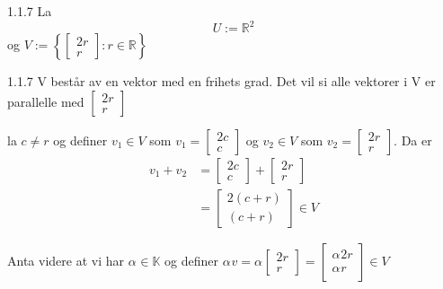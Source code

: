 \documentclass[a4paper,norsk]{article}
\begin{document}
\begin{oppgavebox}{1.1.7}{}
La 
\[
    U:= \mathbb{R}^2
\]
og $ V := \left\{ \begin{bmatrix}
    2r\\
    r
\end{bmatrix} : r \in \mathbb{R} \right\}  $ 

\begin{proofbox}{1.1.7}{}
V består av en vektor med en frihets grad. Det vil si alle vektorer i V er parallelle med $ \begin{bmatrix}
    2r\\
    r
\end{bmatrix}  $ 

la $ c \neq r $ og definer $ v_1 \in V  $ som $ v_1 = \begin{bmatrix}
    2c\\
    c
\end{bmatrix}  $   og $ v_2 \in V $ som $ v_2 = \begin{bmatrix}
    2r \\
    r
\end{bmatrix} $. Da er
\begin{align*}
    v_1 + v_2 &= \begin{bmatrix}
        2c\\
        c
    \end{bmatrix} + \begin{bmatrix}
        2r\\
        r
    \end{bmatrix} \\
    &= \begin{bmatrix}
        2 \left( c + r \right) \\
        \left( c+r \right) 
    \end{bmatrix} \in V
\end{align*}

Anta videre at vi har $ \alpha_{}^{} \in \mathbb{K} $ og definer $ \alpha_{}^{} v = \alpha_{}^{}  \begin{bmatrix}
    2r\\
    r
\end{bmatrix} = \begin{bmatrix}
    \alpha_{}^{} 2 r\\
    \alpha_{}^{} r
\end{bmatrix} \in V $  
\end{proofbox}
\end{oppgavebox}
\end{document}
